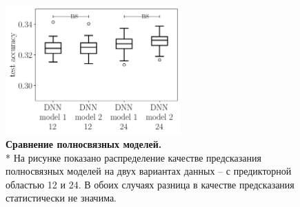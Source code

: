 \begin{figure}[h] %
	\centering
	\includegraphics[width = 0.6\textwidth]{pics/dnn_models_all_runs_p1_ecoli_100000_10000_12_0.png}
	\caption{{\bfseries Сравнение полносвязных моделей.} \\* 
		На рисунке показано распределение качестве предсказания полносвязных моделей на двух вариантах данных -- с предикторной областью 12 и 24. В обоих случаях разница в качестве предсказания статистически не значима. \\
		   \mannwhitni }
	\label{fig:dnn_test}	
\end{figure}